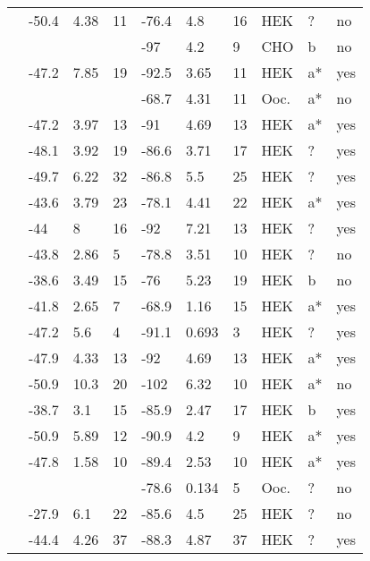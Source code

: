\begin{footnotesize}
\begin{longtable}{p{5cm}|lll|lll|lll}
\citet{Liu2003aMutationDB} & -50.4 & 4.38 & 11 & -76.4 & 4.8 & 16 & HEK & ? & no \\
\citet{Liu2005MutationDB} & && & -97 & 4.2 & 9 & CHO & b & no \\
\citet{Lupoglazoff2001MutationDB} & -47.2 & 7.85 & 19 & -92.5 & 3.65 & 11 & HEK & a* & yes \\
\citet{Makita1998MutationDB} & && & -68.7 & 4.31 & 11 & Ooc. & a* & no \\
\citet{Makita2002MutationDB} & -47.2 & 3.97 & 13 & -91 & 4.69 & 13 & HEK & a* & yes \\
\citet{Makita2005MutationDB} & -48.1 & 3.92 & 19 & -86.6 & 3.71 & 17 & HEK & ? & yes \\
\citet{Makita2008MutationDB} & -49.7 & 6.22 & 32 & -86.8 & 5.5 & 25 & HEK & ? & yes \\
\citet{Makiyama2008MutationDB} & -43.6 & 3.79 & 23 & -78.1 & 4.41 & 22 & HEK & a* & yes \\
\citet{Marangoni2011MutationDB} & -44 & 8 & 16 & -92 & 7.21 & 13 & HEK & ? & yes \\
\citet{MedeirosDomingo2007MutationDB} & -43.8 & 2.86 & 5 & -78.8 & 3.51 & 10 & HEK & ? & no \\
\citet{MedeirosDomingo2009MutationDB} & -38.6 & 3.49 & 15 & -76 & 5.23 & 19 & HEK & b & no \\
\citet{Mohler2004MutationDB} & -41.8 & 2.65 & 7 & -68.9 & 1.16 & 15 & HEK & a* & yes \\
\citet{Mok2003MutationDB} & -47.2 & 5.6 & 4 & -91.1 & 0.693 & 3 & HEK & ? & yes \\
\citet{Moreau2013MutationDB} & -47.9 & 4.33 & 13 & -92 & 4.69 & 13 & HEK & a* & yes \\
\citet{Murphy2012MutationDB} & -50.9 & 10.3 & 20 & -102 & 6.32 & 10 & HEK & a* & no \\
\citet{Nakajima2015MutationDB} & -38.7 & 3.1 & 15 & -85.9 & 2.47 & 17 & HEK & b & yes \\
\citet{Neu2010MutationDB} & -50.9 & 5.89 & 12 & -90.9 & 4.2 & 9 & HEK & a* & yes \\
\citet{Nguyen2008MutationDB} & -47.8 & 1.58 & 10 & -89.4 & 2.53 & 10 & HEK & a* & yes \\
\citet{OLeary2002MutationDB} & && & -78.6 & 0.134 & 5 & Ooc. & ? & no \\
\citet{Olesen2012MutationDB} & -27.9 & 6.1 & 22 & -85.6 & 4.5 & 25 & HEK & ? & no \\
\citet{Otagiri2008MutationDB} & -44.4 & 4.26 & 37 & -88.3 & 4.87 & 37 & HEK & ? & yes \\

\end{longtable}
\end{footnotesize}
